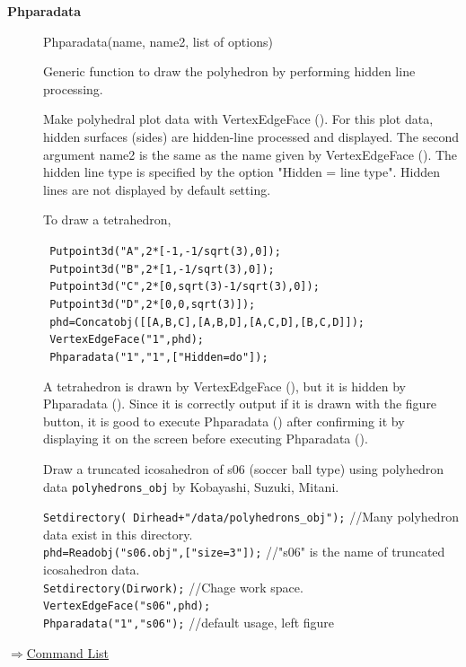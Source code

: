 \documentclass[papersize,a4paper,12pt]{article}
\newenvironment{cmd}[2]{
\hypertarget{#2}{}
\begin{center}{\bf\large #1}\end{center}
\begin{description}
}{
\end{description}
\begin{flushright} \hyperlink{functionlist}{$\Rightarrow$Command List}\end{flushright}
}
\newcommand{\itemket}[1]{
\item[\Ltab{27mm}{#1}]
}
\begin{document}
\begin{cmd}{Phparadata}{phparadata}

\itemket{Usage}Phparadata(name, name2, list of options)
\itemket{Description}Generic function to draw the polyhedron by performing hidden line processing.
\itemket{Details}Make polyhedral plot data with VertexEdgeFace (). For this plot data, hidden surfaces (sides) are hidden-line processed and displayed. The second argument name2 is the same as the name given by VertexEdgeFace (). The hidden line type is specified by the option "Hidden = line type". Hidden lines are not displayed by default setting.
\itemket{Examples}  \mbox{}

To draw a tetrahedron,

\begin{minipage}[t]{100mm}
\verb| Putpoint3d("A",2*[-1,-1/sqrt(3),0]);|\\
\verb| Putpoint3d("B",2*[1,-1/sqrt(3),0]);|\\
\verb| Putpoint3d("C",2*[0,sqrt(3)-1/sqrt(3),0]);|\\
\verb| Putpoint3d("D",2*[0,0,sqrt(3)]);|\\
\verb| phd=Concatobj([[A,B,C],[A,B,D],[A,C,D],[B,C,D]]);|\\
\verb| VertexEdgeFace("1",phd);|\\
\verb| Phparadata("1","1",["Hidden=do"]);|\\
\end{minipage}\hspace{5mm}%
\begin{minipage}[t]{30mm}
\mbox{}\vspace{-15mm}


\end{minipage}



A tetrahedron is drawn by VertexEdgeFace (), but it is hidden by Phparadata (). Since it is correctly output if it is drawn with the figure button, it is good to execute Phparadata () after confirming it by displaying it on the screen before executing Phparadata ().

\vspace{\baselineskip}
Draw a truncated icosahedron of s06 (soccer ball type) using polyhedron data \verb|polyhedrons_obj| by Kobayashi, Suzuki, Mitani.

\verb|Setdirectory( Dirhead+"/data/polyhedrons_obj");|  //Many polyhedron data exist in this directory.\\
\verb|phd=Readobj("s06.obj",["size=3"]);|  //"s06" is the name of truncated icosahedron data.\\
\verb|Setdirectory(Dirwork);|  //Chage work space.\\
\verb|VertexEdgeFace("s06",phd);|\\
\verb|Phparadata("1","s06");|  //default usage, left figure\\


\end{cmd}
\end{document}
